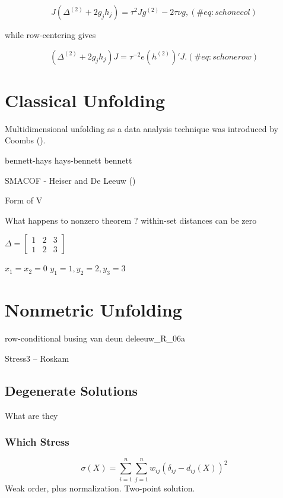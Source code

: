 \documentclass[
  12pt,
  letterpaper,
  DIV=11,
  numbers=noendperiod]{scrreprt}
\theoremstyle{remark}
\begin{document}
\begin{equation}
J(\Delta^{(2)}+2g_jh_j)=\tau^2 Jg^{(2)}-2\tau\nu g,
(\#eq:schonecol)
\end{equation}

while row-centering gives

\begin{equation}
(\Delta^{(2)}+2g_jh_j)J=\tau^{-2}e(h^{(2)})'J.
(\#eq:schonerow)
\end{equation}

\section{Classical Unfolding}\label{classical-unfolding}

Multidimensional unfolding as a data analysis technique was introduced
by Coombs ().

bennett-hays hays-bennett bennett

SMACOF - Heiser and De Leeuw ()

Form of V

What happens to nonzero theorem ? within-set distances can be zero

\(\Delta=\begin{bmatrix}1&2&3\\1&2&3\end{bmatrix}\)

\(x_1=x_2=0\) \(y_1=1,y_2=2,y_3=3\)

\section{Nonmetric Unfolding}\label{nonmetric-unfolding}

row-conditional busing van deun deleeuw\_R\_06a

Stress3 -- Roskam

\subsection{Degenerate Solutions}\label{unfdegenerate}

What are they

\subsubsection{Which Stress}\label{which-stress}

\[
\sigma(X)=\sum_{i=1}^n\sum_{j=1}^n w_{ij}(\delta_{ij}-d_{ij}(X))^2
\] Weak order, plus normalization. Two-point solution.
\end{document}
